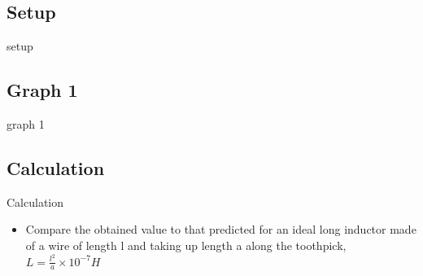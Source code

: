 \documentclass{article}
\def\F#1{\(#1\)}
\begin{document}
\begin{center}
  \subsection*{Setup}
  setup
  \subsection*{Graph 1}
  graph 1
  \subsection*{Calculation}
  Calculation
\end{center}
\begin{itemize}
  \item Compare the obtained value to that predicted for an ideal long inductor made of a wire of length l and taking up length a along the toothpick, \F{L=\frac{l^2}{a}\times{10}^{-7}H}
\end{itemize}
\end{document}
